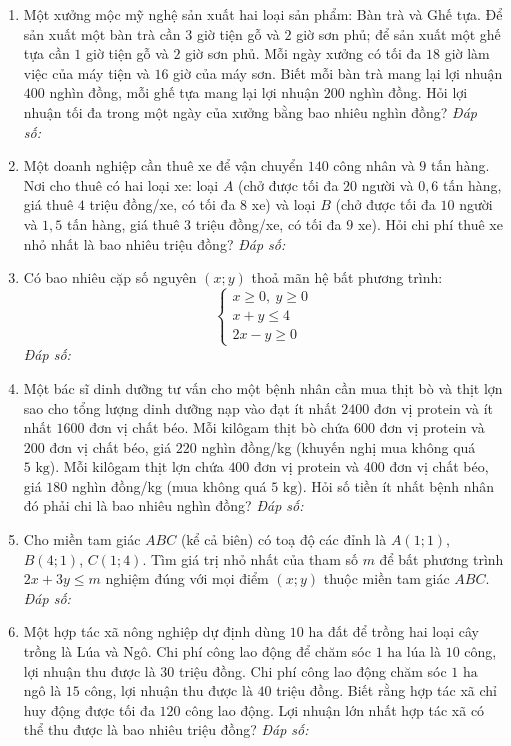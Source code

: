 \documentclass[12pt,a4paper]{article}
\newcommand{\answerbox}{\hfill\textit{Đáp số:}\ \fbox{\rule{0pt}{9pt}\hspace{2.2cm}}}
\begin{document}
\newpage

\begin{enumerate}[resume]
\item Một xưởng mộc mỹ nghệ sản xuất hai loại sản phẩm: Bàn trà và Ghế tựa. Để sản xuất một bàn trà cần $3$ giờ tiện gỗ và $2$ giờ sơn phủ; để sản xuất một ghế tựa cần $1$ giờ tiện gỗ và $2$ giờ sơn phủ. Mỗi ngày xưởng có tối đa $18$ giờ làm việc của máy tiện và $16$ giờ của máy sơn. Biết mỗi bàn trà mang lại lợi nhuận $400$ nghìn đồng, mỗi ghế tựa mang lại lợi nhuận $200$ nghìn đồng. Hỏi lợi nhuận tối đa trong một ngày của xưởng bằng bao nhiêu nghìn đồng?
\answerbox

\item Một doanh nghiệp cần thuê xe để vận chuyển $140$ công nhân và $9$ tấn hàng. Nơi cho thuê có hai loại xe: loại $A$ (chở được tối đa $20$ người và $0{,}6$ tấn hàng, giá thuê $4$ triệu đồng/xe, có tối đa $8$ xe) và loại $B$ (chở được tối đa $10$ người và $1{,}5$ tấn hàng, giá thuê $3$ triệu đồng/xe, có tối đa $9$ xe). Hỏi chi phí thuê xe nhỏ nhất là bao nhiêu triệu đồng?
\answerbox

\item Có bao nhiêu cặp số nguyên $(x; y)$ thoả mãn hệ bất phương trình:
\[
\begin{cases}
x \ge 0,\ y \ge 0 \\
x + y \le 4 \\
2x - y \ge 0
\end{cases}
\]
\answerbox

\item Một bác sĩ dinh dưỡng tư vấn cho một bệnh nhân cần mua thịt bò và thịt lợn sao cho tổng lượng dinh dưỡng nạp vào đạt ít nhất $2400$ đơn vị protein và ít nhất $1600$ đơn vị chất béo. Mỗi kilôgam thịt bò chứa $600$ đơn vị protein và $200$ đơn vị chất béo, giá $220$ nghìn đồng/kg (khuyến nghị mua không quá $5\text{ kg}$). Mỗi kilôgam thịt lợn chứa $400$ đơn vị protein và $400$ đơn vị chất béo, giá $180$ nghìn đồng/kg (mua không quá $5\text{ kg}$). Hỏi số tiền ít nhất bệnh nhân đó phải chi là bao nhiêu nghìn đồng?
\answerbox

\item Cho miền tam giác $ABC$ (kể cả biên) có toạ độ các đỉnh là $A(1; 1)$, $B(4; 1)$, $C(1; 4)$. Tìm giá trị nhỏ nhất của tham số $m$ để bất phương trình $2x + 3y \le m$ nghiệm đúng với mọi điểm $(x; y)$ thuộc miền tam giác $ABC$.
\answerbox

\item Một hợp tác xã nông nghiệp dự định dùng $10\text{ ha}$ đất để trồng hai loại cây trồng là Lúa và Ngô. Chi phí công lao động để chăm sóc $1\text{ ha}$ lúa là $10$ công, lợi nhuận thu được là $30$ triệu đồng. Chi phí công lao động chăm sóc $1\text{ ha}$ ngô là $15$ công, lợi nhuận thu được là $40$ triệu đồng. Biết rằng hợp tác xã chỉ huy động được tối đa $120$ công lao động. Lợi nhuận lớn nhất hợp tác xã có thể thu được là bao nhiêu triệu đồng?
\answerbox


\end{enumerate}
\end{document}
